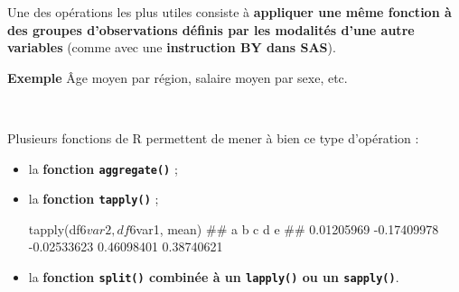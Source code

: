 \documentclass[12pt,twosided, notitlepage]{book}
\newenvironment{Shaded}{}{}
\newcommand{\KeywordTok}[1]{\textcolor[rgb]{0.00,0.00,1.00}{{#1}}}
\newcommand{\CommentTok}[1]{\textcolor[rgb]{0.00,0.50,0.00}{{#1}}}
\newcommand{\NormalTok}[1]{{#1}}
\renewenvironment{Shaded}{\begin{snugshade}}{\end{snugshade}}
\begin{document}
Une des opérations les plus utiles consiste à \textbf{appliquer une même
fonction à des groupes d'observations définis par les modalités d'une
autre variables} (comme avec une \textbf{instruction BY dans SAS}).

\textbf{Exemple} Âge moyen par région, salaire moyen par sexe, etc.

~

Plusieurs fonctions de R permettent de mener à bien ce type d'opération
:

\begin{itemize}
\item
  la \textbf{fonction
  \texttt{aggregate()}} ;

\begin{Shaded}
\end{Shaded}
\item
  la \textbf{fonction \texttt{tapply()}} ;

\begin{Shaded}
\begin{Highlighting}[]
\KeywordTok{tapply}\NormalTok{(df6$var2, df6$var1, mean)}
  \NormalTok{##           a           b           c           d           e }
  \NormalTok{##  0.01205969 -0.17409978 -0.02533623  0.46098401  0.38740621}
\end{Highlighting}
\end{Shaded}
\item
  la \textbf{fonction \texttt{split()} combinée à un \texttt{lapply()}
  ou un
  \texttt{sapply()}}.


\end{itemize}
\end{document}
